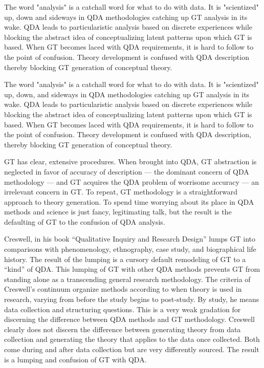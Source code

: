 The word "analysis" is a catchall word for what to do with data.
It is "scientized" up, down and sideways in QDA methodologies catching up GT analysis in its
wake.
QDA leads to particularistic analysis based on discrete experiences while
blocking the abstract idea of conceptualizing latent patterns upon which GT is
based.
When GT becomes laced with QDA requirements, it is hard to follow to
the point of confusion.
Theory development is confused with QDA description thereby blocking GT generation of conceptual theory.

The word "analysis" is a catchall word for what to do with data.
It is "scientized" up, down, and sideways in QDA methodologies catching up GT analysis in its
wake.
QDA leads to particularistic analysis based on discrete experiences while
blocking the abstract idea of conceptualizing latent patterns upon which GT is
based.
When GT becomes laced with QDA requirements, it is hard to follow to
the point of confusion.
Theory development is confused with QDA description, thereby blocking GT generation of conceptual theory.

GT has clear, extensive procedures.
When brought into QDA, GT abstraction is neglected in favor of accuracy of description
--- the dominant concern of QDA methodology --- 
and GT acquires the QDA problem of worrisome accuracy
---
an irrelevant concern in GT.
To repeat, GT methodology is a straightforward approach to theory generation.
To spend time worrying about its place in QDA methods and science is just fancy, legitimating talk, but the result is the defaulting of GT to the confusion of QDA analysis.

Creswell, in his book “Qualitative Inquiry and Research Design”
\citep{book.creswell98}
lumps GT into comparisons with phenomenology, ethnography, case study, and biographical life history. 
The result of the lumping is a cursory default remodeling of GT to a “kind” of QDA. 
This lumping of GT with other QDA methods prevents GT from standing alone as a transcending general research methodology.
The criteria of Creswell’s continuum organize methods according to when theory is used in research, varying from before the study begins to post-study. 
By study, he means data collection and structuring questions. This is a very weak gradation for discerning the difference between QDA methods and GT methodology. 
Creswell clearly does not discern the difference between generating theory from data collection and generating the theory that applies to the
data once collected. 
Both come during and after data collection but are very differently sourced.
The result is a lumping and confusion of GT with QDA.

